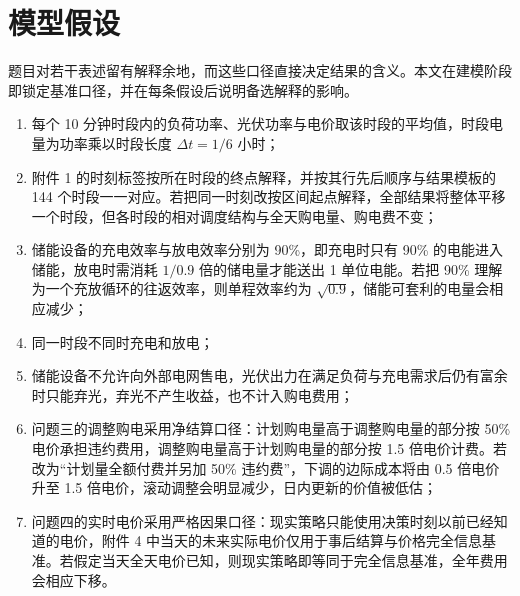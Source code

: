 \section{模型假设}

题目对若干表述留有解释余地，而这些口径直接决定结果的含义。本文在建模阶段即锁定基准口径，并在每条假设后说明备选解释的影响。

\begin{enumerate}
  \item 每个 10 分钟时段内的负荷功率、光伏功率与电价取该时段的平均值，时段电量为功率乘以时段长度 $\Delta t = 1/6$ 小时；
  \item 附件 1 的时刻标签按所在时段的终点解释，并按其行先后顺序与结果模板的 144 个时段一一对应。若把同一时刻改按区间起点解释，全部结果将整体平移一个时段，但各时段的相对调度结构与全天购电量、购电费不变；
  \item 储能设备的充电效率与放电效率分别为 90\%，即充电时只有 90\% 的电能进入储能，放电时需消耗 $1/0.9$ 倍的储电量才能送出 1 单位电能。若把 90\% 理解为一个充放循环的往返效率，则单程效率约为 $\sqrt{0.9}$，储能可套利的电量会相应减少；
  \item 同一时段不同时充电和放电；
  \item 储能设备不允许向外部电网售电，光伏出力在满足负荷与充电需求后仍有富余时只能弃光，弃光不产生收益，也不计入购电费用；
  \item 问题三的调整购电采用净结算口径：计划购电量高于调整购电量的部分按 50\% 电价承担违约费用，调整购电量高于计划购电量的部分按 1.5 倍电价计费。若改为``计划量全额付费并另加 50\% 违约费''，下调的边际成本将由 0.5 倍电价升至 1.5 倍电价，滚动调整会明显减少，日内更新的价值被低估；
  \item 问题四的实时电价采用严格因果口径：现实策略只能使用决策时刻以前已经知道的电价，附件 4 中当天的未来实际电价仅用于事后结算与价格完全信息基准。若假定当天全天电价已知，则现实策略即等同于完全信息基准，全年费用会相应下移。
\end{enumerate}